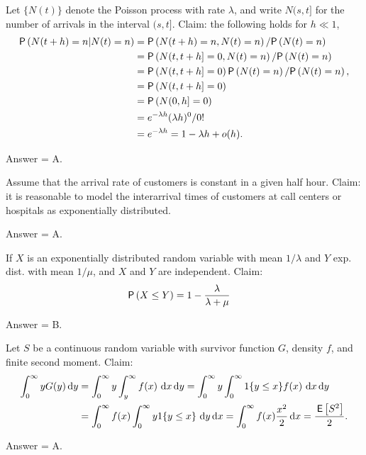 \begin{exercise}[201807]
Let $\{N(t)\}$ denote the Poisson process with rate $\lambda$, and write $N(s, t]$ for the number of arrivals in the interval $(s,t]$. Claim:  the following holds for $h\ll 1$, 
    \begin{align*}
  \P{N(t+h) = n | N(t) = n} 
&=  \P{N(t+h) = n, N(t) = n}/\P{N(t)=n} \\
&=  \P{N(t, t+h] = 0,  N(t) = n}/\P{N(t)=n} \\
&=  \P{N(t, t+h] = 0} \P{N(t) = n}/\P{N(t)=n}, \\
&= \P{N(t, t+h] = 0} \\
&= \P{N(0, h] = 0} \\
&= e^{-\lambda h} (\lambda h)^0/0! \\
&= e^{-\lambda h} = 1-\lambda h + o(h).
    \end{align*}
\begin{solution}
Answer = A.
\end{solution}
\end{exercise}



\begin{exercise}[201807]
Assume that the arrival rate of customers is constant in a given half hour. Claim: it is reasonable to model the interarrival times of customers at call centers or hospitals as  exponentially distributed.
\begin{solution}
Answer = A.
\end{solution}
\end{exercise}

\begin{exercise}[201807]
If $X$ is an exponentially distributed random variable with mean $1/\lambda$ and $Y$ exp. dist. with mean $1/\mu$, and $X$ and $Y$ are independent. Claim:
\begin{align*}
    \P{X\leq Y} 
&= 1 - \frac{\lambda}{\lambda + \mu} 
\end{align*}

\begin{solution}
Answer = B.
\end{solution}
\end{exercise}

\begin{exercise}[201807]
Let $S$ be  a continuous random variable with survivor function $G$, density $f$, and finite second moment. Claim:
  \begin{align*}
\int_0^\infty y G(y) \,\text{d}y 
&=  \int_0^\infty y \int_y^\infty f(x)\, \,\text{d}x \,\text{d}y =  \int_0^\infty y \int_0^\infty 1\{y\leq x\}f(x)\, \,\text{d}x \,\text{d}y\\
&=  \int_0^\infty f(x) \int_0^\infty y 1\{y \leq x\}\, \,\text{d}y \,\text{d}x
=  \int_0^\infty f(x) \frac{x^2}2 \,\text{d}x =\frac{\,\mathsf{E}\left[S^2\right]}2.
  \end{align*}

\begin{solution}
Answer = A.
\end{solution}
\end{exercise}




